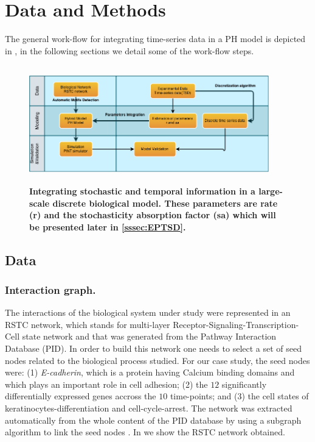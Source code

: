 
\section{Data and Methods}

The general work-flow for integrating time-series data in a PH model is depicted in , in the following sections we 
detail some of the work-flow steps.
\begin{figure}[H]
 \centering
 \includegraphics[width=4.1in,height=2in]{images/workflow-2.png}
\caption{{\bf Integrating stochastic and temporal information in a large-scale discrete biological model. These parameters are rate (r) and the stochasticity absorption factor (sa) which 
will be presented later in \ref{sssec:EPTSD}.}} 
 \label{fig:workflow}
\end{figure}


\subsection{Data}

\subsubsection{Interaction graph.}
\label{ssec:RSTC}
The interactions of the biological system under study were represented in
 an RSTC network, which stands for  multi-layer Receptor-Signaling-Transcription-Cell state network and that was generated from the Pathway Interaction Database (PID).
In order to build this network one needs to select a set of seed nodes related to the biological process studied.
For our case study, the seed nodes were:  (1) \emph{E-cadherin}, which is a protein having Calcium binding domains and which plays an important role in cell adhesion;
(2) the $12$ significantly differentially expressed genes accross the $10$ time-points; and (3) the cell states of keratinocytes-differentiation and cell-cycle-arrest. 
The network was extracted automatically from the whole content of the PID database by using a subgraph algorithm to link the seed nodes \cite{guziolowski2012automatic}. 
In  we show the RSTC network obtained. 


